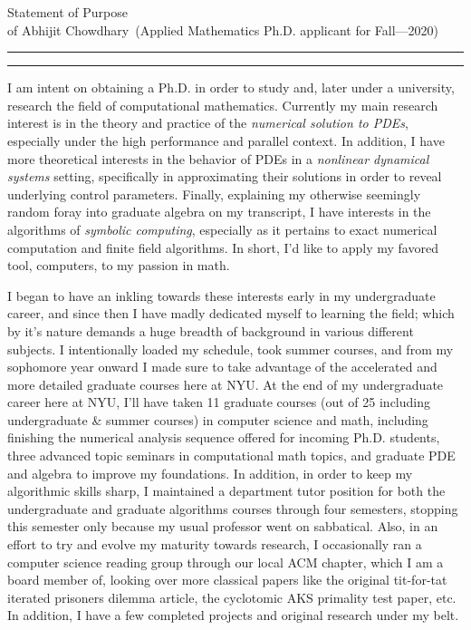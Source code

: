 \documentclass[11pt]{article}
\newcommand{\soptitle}{Statement of Purpose}
\newcommand{\yourname}{Abhijit Chowdhary}
\begin{document}
\begin{center}\LARGE\soptitle\\
\large of \yourname\ (Applied Mathematics Ph.D. applicant for Fall---2020)
\end{center}

\hrule
\vspace{1pt}
\hrule height 1pt

\bigskip

I am intent on obtaining a Ph.D. in order to study and, later under
a university, research the field of computational mathematics. Currently my
main research interest is in the theory and practice of the {\em numerical
solution to PDEs}, especially under the high performance and parallel context.
In addition, I have more theoretical interests in the behavior of PDEs in a {\em
nonlinear dynamical systems} setting, specifically in approximating their
solutions in order to reveal underlying control parameters. Finally, explaining
my otherwise seemingly random foray into graduate algebra on my transcript,
I have interests in the algorithms of {\em symbolic computing}, especially as it
pertains to exact numerical computation and finite field algorithms. In short,
I'd like to apply my favored tool, computers, to my passion in math.

I began to have an inkling towards these interests early in my undergraduate
career, and since then I have madly dedicated myself to learning the field;
which by it's nature demands a huge breadth of background in various different
subjects. I intentionally loaded my schedule, took summer courses, and from my
sophomore year onward I made sure to take advantage of the accelerated and more
detailed graduate courses here at NYU. At the end of my undergraduate career
here at NYU, I'll have taken 11 graduate courses (out of 25 including
undergraduate \& summer courses) in computer science and math, including
finishing the numerical analysis sequence offered for incoming Ph.D. students,
three advanced topic seminars in computational math topics, and graduate PDE and
algebra to improve my foundations. In addition, in order to keep my algorithmic
skills sharp, I maintained a department tutor position for both the
undergraduate and graduate algorithms courses through four semesters, stopping
this semester only because my usual professor went on sabbatical. Also, in an
effort to try and evolve my maturity towards research, I occasionally ran
a computer science reading group through our local ACM chapter, which I am
a board member of, looking over more classical papers like the original
tit-for-tat iterated prisoners dilemma article, the cyclotomic AKS primality
test paper, etc. In addition, I have a few completed projects and original
research under my belt.
\end{document}
